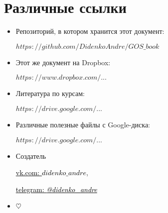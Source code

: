 {\let\clearpage\relax\chapter{Различные ссылки}}
\begin{itemize}
\item

Репозиторий, в котором хранится этот документ:

\href{https://github.com/DidenkoAndre/GOS_book}{$https://github.com/DidenkoAndre/GOS\_book$}

\item

Этот же документ на Dropbox:

\href{https://www.dropbox.com/sh/7e5mfj8q68o2ipp/AAD8XvpZhiJzFbEh_IeH305ia?dl=0&preview=GOSBook.pdf}{$https://www.dropbox.com/...$}

\item
Литература по курсам:

\href{https://drive.google.com/drive/u/0/folders/0BzuzEyNkpwYDcENXcV9jNWdwVlU}{$https://drive.google.com/...$}

\item
Различные полезные файлы с Google-диска:

\href{https://drive.google.com/drive/u/0/folders/0BzuzEyNkpwYDYjVNcE0wa3hqWjA}{$https://drive.google.com/...$}

\item
Создатель

\href{https://vk.com/didenko_andre}{\textcolor{black}{vk.com: \textcolor{Purplemountainmajesty}{$didenko\_andre$}}},

\href{https://telegram.me/didenko_andre}{\textcolor{black}{telegram: \textcolor{Purplemountainmajesty}{\textit{@didenko_andre}}}}

\item

$\heartsuit$
\end{itemize}

